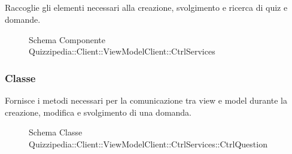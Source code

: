 \subsection{}
Raccoglie gli elementi necessari alla creazione, svolgimento e ricerca di quiz e domande.
\begin{figure}[H]
\centering
\noindent{}
\caption[Schema Componente Quizzipedia::Client::ViewModelClient::CtrlServices]{Schema Componente Quizzipedia::Client::ViewModelClient::CtrlServices}
\end{figure}
\subsubsection{Classe }
Fornisce i metodi necessari per la comunicazione tra view e model durante la creazione, modifica e svolgimento di una domanda.
\begin{figure}[H]
\centering
\noindent{}
\caption[Schema Classe CtrlQuestion]{Schema Classe Quizzipedia::Client::ViewModelClient::CtrlServices::CtrlQuestion}
\end{figure}
